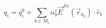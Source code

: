 \documentclass[12pt]{standalone}
\begin{document}
  \begin{varwidth}{50in}
  $$
    q_{i} = q_{i}^{0} + \sum_{b \in M_{i}} \alpha_{b}^{i}
    \vec{E}^{fic} \left( \vec{r}_{h_{b}} \right) \cdot \hat{r}_{b}
  $$
  \end{varwidth}
\end{document}
